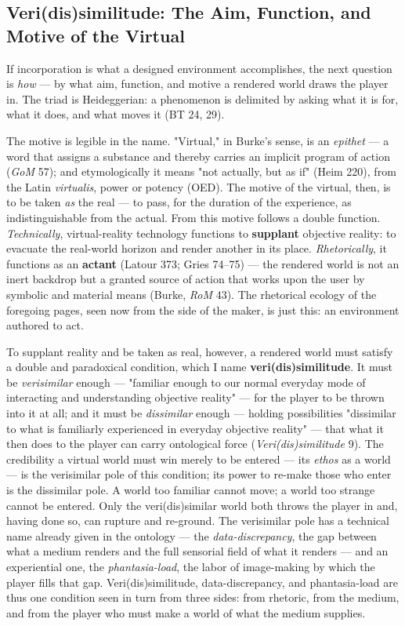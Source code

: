 \documentclass{article}
\begin{document}
\bigskip

\subsection*{Veri(dis)similitude: The Aim, Function, and Motive of the Virtual}

If incorporation is what a designed environment accomplishes, the next question is \textit{how} — by what aim, function, and motive a rendered world draws the player in. The triad is Heideggerian: a phenomenon is delimited by asking what it is for, what it does, and what moves it (BT 24, 29).

The motive is legible in the name. "Virtual," in Burke's sense, is an \textit{epithet} — a word that assigns a substance and thereby carries an implicit program of action (\textit{GoM} 57); and etymologically it means "not actually, but as if" (Heim 220), from the Latin \textit{virtualis}, power or potency (OED). The motive of the virtual, then, is to be taken \textit{as} the real — to pass, for the duration of the experience, as indistinguishable from the actual. From this motive follows a double function. \textit{Technically}, virtual-reality technology functions to \textbf{supplant} objective reality: to evacuate the real-world horizon and render another in its place. \textit{Rhetorically}, it functions as an \textbf{actant} (Latour 373; Gries 74–75) — the rendered world is not an inert backdrop but a granted source of action that works upon the user by symbolic and material means (Burke, \textit{RoM} 43). The rhetorical ecology of the foregoing pages, seen now from the side of the maker, is just this: an environment authored to act.

To supplant reality and be taken as real, however, a rendered world must satisfy a double and paradoxical condition, which I name \textbf{veri(dis)similitude}. It must be \textit{verisimilar} enough — "familiar enough to our normal everyday mode of interacting and understanding objective reality" — for the player to be thrown into it at all; and it must be \textit{dissimilar} enough — holding possibilities "dissimilar to what is familiarly experienced in everyday objective reality" — that what it then does to the player can carry ontological force (\textit{Veri(dis)similitude} 9). The credibility a virtual world must win merely to be entered — its \textit{ethos} as a world — is the verisimilar pole of this condition; its power to re-make those who enter is the dissimilar pole. A world too familiar cannot move; a world too strange cannot be entered. Only the veri(dis)similar world both throws the player in and, having done so, can rupture and re-ground. The verisimilar pole has a technical name already given in the ontology — the \textit{data-discrepancy}, the gap between what a medium renders and the full sensorial field of what it renders — and an experiential one, the \textit{phantasia-load}, the labor of image-making by which the player fills that gap. Veri(dis)similitude, data-discrepancy, and phantasia-load are thus one condition seen in turn from three sides: from rhetoric, from the medium, and from the player who must make a world of what the medium supplies.
\end{document}
